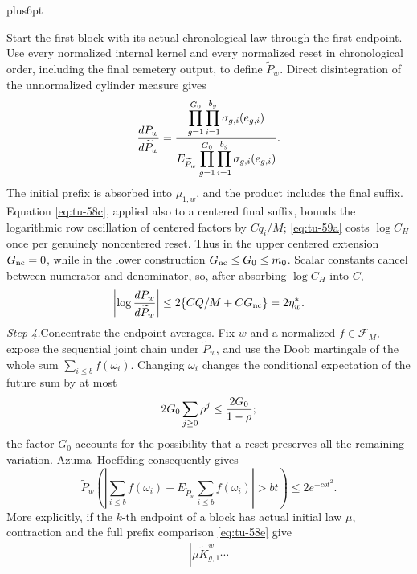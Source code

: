 \documentclass[12pt,reqno]{amsart}
\makeatletter
\theoremstyle{plain}
\theoremstyle{definition}
\theoremstyle{remark}
\renewenvironment{proof}[1][\proofname]{%
  \par
  \pushQED{\qed}%
  \normalfont
  \topsep6pt plus6pt\relax
  \trivlist
  \item[\hskip\labelsep\slshape #1\@addpunct{.}]%
  \ignorespaces
}{%
  \popQED
  \endtrivlist
  \@endpefalse
}
\DeclareRobustCommand{\qed}{%
  \leavevmode\unskip\penalty9999\hbox{}\nobreak
  \ifmmode
    \makebox[0pt][l]{\qquad\hbox{\qedsymbol}}%
  \else
    \qquad\hbox{\qedsymbol}%
  \fi
}
\renewcommand{\qedsymbol}{\rule[.47pt]{4pt}{6pt}}
\numberwithin{equation}{section}
\makeatother
\begin{document}
\begin{proof}[Proof of Lemma~\ref{lem:terminal-feynman-kac}]
Start the first block with its actual chronological law through the first
endpoint.  Use every normalized internal kernel and every normalized reset
in chronological order, including the final cemetery output, to define
\(\widetilde P_w\).  Direct disintegration of the unnormalized cylinder
measure gives
\begin{equation}
 {dP_w\over d\widetilde P_w}
 ={\displaystyle\prod_{g=1}^{G_0}\prod_{i=1}^{b_g}
          \sigma_{g,i}(e_{g,i})\over
   \displaystyle E_{\widetilde P_w}
       \prod_{g=1}^{G_0}\prod_{i=1}^{b_g}
          \sigma_{g,i}(e_{g,i})}.                           \label{eq:tu-60a}
\end{equation}
The initial prefix is absorbed into \(\mu_{1,w}\), and the product
includes the final suffix. Equation \eqref{eq:tu-58c}, applied also to a centered final suffix, bounds the
logarithmic row oscillation of centered factors by \(Cq_i/M\); \eqref{eq:tu-59a} costs
\(\log C_H\) once per genuinely noncentered reset.  Thus in the upper
centered extension \(G_{\rm nc}=0\), while in the lower construction
\(G_{\rm nc}\le G_0\le m_0\).  Scalar
constants cancel between numerator and denominator, so, after absorbing
\(\log C_H\) into \(C\),
\begin{equation}
 \left|\log{dP_w\over d\widetilde P_w}\right|
 \le2\{CQ/M+CG_{\rm nc}\}=2\eta_w^*.                       \label{eq:tu-60b}
\end{equation}
\smallskip\noindent
\underline{\textit{Step 4.}}\quad Concentrate the endpoint averages.
Fix \(w\) and a normalized
\(f\in\mathcal{F}_M\), expose the sequential joint chain under
\(\widetilde P_w\), and use the Doob martingale of
the whole sum \(\sum_{i\le b}f(\omega_i)\).  Changing \(\omega_i\) changes the
conditional expectation of the future sum by at most
\[
       2G_0\sum_{j\ge0}\rho^j\le {2G_0\over1-\rho};
\]
the factor \(G_0\) accounts for the possibility that a reset preserves
all the remaining variation.
Azuma--Hoeffding consequently gives
\begin{equation}
 \widetilde P_w\left(\left|\sum_{i\le b}f(\omega_i)
       -E_{\widetilde P_w}\sum_{i\le b}f(\omega_i)\right|>bt\right)
 \le2e^{-cbt^2}.                                             \label{eq:tu-61}
\end{equation}
More explicitly, if the \(k\)-th endpoint of a block has actual initial
law \(\mu\), contraction and the full prefix comparison \eqref{eq:tu-58e} give
\begin{equation}
\begin{split}
\left|\mu\widetilde K_{g,1}^w\cdots

\end{split}
\end{equation}
\end{proof}
\end{document}
